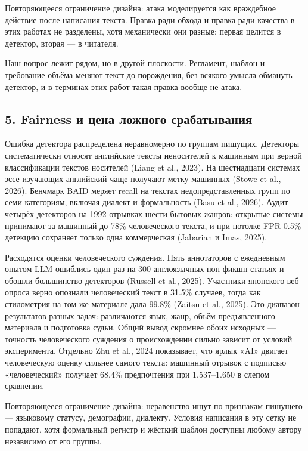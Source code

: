 \documentclass[11pt,a4paper]{article}
\renewcommand{\_}{\textunderscore\allowbreak}
\begin{document}
Повторяющееся ограничение дизайна: атака моделируется как враждебное действие
после написания текста. Правка ради обхода и правка ради качества в этих работах
не разделены, хотя механически они разные: первая целится в детектор, вторая — в
читателя.

Наш вопрос лежит рядом, но в другой плоскости. Регламент, шаблон и требование
объёма меняют текст до порождения, без всякого умысла обмануть детектор, и в
терминах этих работ такая правка вообще не атака.

\subsection{5. Fairness и цена ложного срабатывания}

Ошибка детектора распределена неравномерно по группам пишущих. Детекторы
систематически относят английские тексты неносителей к машинным при верной
классификации текстов носителей (Liang et al., 2023). На шестнадцати системах эссе изучающих
английский чаще получают метку машинных (Stowe et al., 2026). Бенчмарк BAID меряет recall на
текстах недопредставленных групп по семи категориям, включая диалект и
формальность (Basu et al., 2026). Аудит четырёх детекторов на 1992 отрывках шести бытовых
жанров: открытые системы принимают за машинный до 78\% человеческого текста, и при
потолке FPR 0.5\% детекцию сохраняет только одна коммерческая (Jabarian и Imas, 2025).

Расходятся оценки человеческого суждения. Пять аннотаторов с ежедневным опытом
LLM ошиблись один раз на 300 англоязычных нон-фикшн статьях и обошли большинство
детекторов (Russell et al., 2025). Участники японского веб-опроса верно опознали человеческий
текст в 31.5\% случаев, тогда как стилометрия на том же материале дала 99.8\%
(Zaitsu et al., 2025). Это диапазон результатов разных задач: различаются язык, жанр, объём
предъявленного материала и подготовка судьи. Общий вывод скромнее обоих
исходных — точность человеческого суждения о происхождении сильно зависит от
условий эксперимента. Отдельно Zhu et al., 2024 показывает, что ярлык «AI» двигает
человеческую оценку сильнее самого текста: машинный отрывок с подписью
«человеческий» получает 68.4\% предпочтения при 1.537–1.650 в слепом сравнении.

Повторяющееся ограничение дизайна: неравенство ищут по признакам пишущего —
языковому статусу, демографии, диалекту. Условия написания в эту сетку не
попадают, хотя формальный регистр и жёсткий шаблон доступны любому автору
независимо от его группы.
\end{document}
